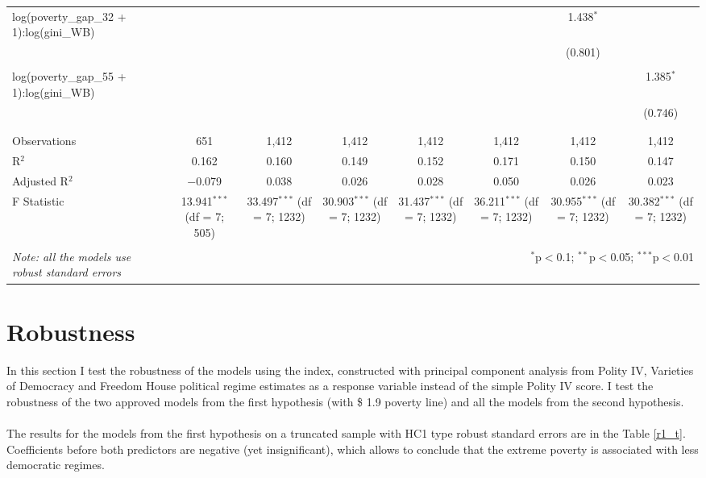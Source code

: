 \documentclass[a4paper, 12pt]{article}
\begin{document}
\begin{table}[!htbp]
{\begin{tabular}{@{\extracolsep{5pt}}lccccccc}
 log(poverty\_gap\_32 + 1):log(gini\_WB) &  &  &  &  &  & 1.438$^{*}$ &  \\ 
  &  &  &  &  &  & (0.801) &  \\ 
  & & & & & & & \\ 
 log(poverty\_gap\_55 + 1):log(gini\_WB) &  &  &  &  &  &  & 1.385$^{*}$ \\ 
  &  &  &  &  &  &  & (0.746) \\ 
  & & & & & & & \\ 
\hline \\[-1.8ex] 
Observations & 651 & 1,412 & 1,412 & 1,412 & 1,412 & 1,412 & 1,412 \\ 
R$^{2}$ & 0.162 & 0.160 & 0.149 & 0.152 & 0.171 & 0.150 & 0.147 \\ 
Adjusted R$^{2}$ & $-$0.079 & 0.038 & 0.026 & 0.028 & 0.050 & 0.026 & 0.023 \\ 
F Statistic & 13.941$^{***}$ (df = 7; 505) & 33.497$^{***}$ (df = 7; 1232) & 30.903$^{***}$ (df = 7; 1232) & 31.437$^{***}$ (df = 7; 1232) & 36.211$^{***}$ (df = 7; 1232) & 30.955$^{***}$ (df = 7; 1232) & 30.382$^{***}$ (df = 7; 1232) \\ 
\hline 
\hline \\[-1.8ex] 
\textit{Note: all the models use robust standard errors}  & \multicolumn{7}{r}{$^{*}$p$<$0.1; $^{**}$p$<$0.05; $^{***}$p$<$0.01} \\ 
\end{tabular}
}
\end{table}
    
    
    \section{Robustness}
    
    In this section I test the robustness of the models using the index, constructed with principal component analysis from Polity IV, Varieties of Democracy \parencite{VDemV10} and Freedom House \parencite{freedomhouse} political regime estimates as a response variable instead of the simple Polity IV score. I test the robustness of the two approved models from the first hypothesis (with \$ 1.9 poverty line) and all the models from the second hypothesis.
    \\\\
    \noindent The results for the models from the first hypothesis on a truncated sample with HC1 type robust standard errors are in the Table \ref{r1_t}. Coefficients before both predictors are  negative (yet insignificant), which allows to conclude that the extreme poverty is associated with less democratic regimes.
    
\end{document}
